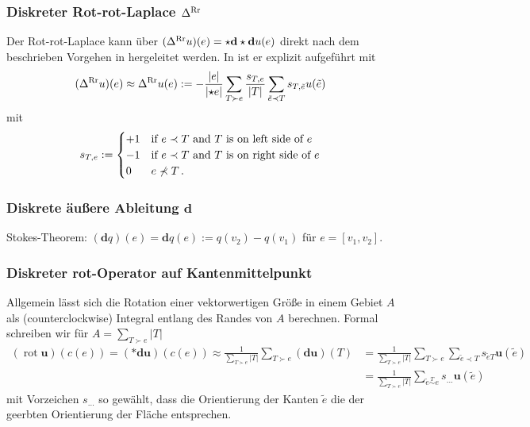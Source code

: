\documentclass[a4paper,11pt]{scrartcl}
\newcommand{\U}{u} %
\newcommand{\Ub}{\mathbf{\U}} %
\newcommand{\rot}{\operatorname{rot}} %
\newcommand{\exd}{\mathbf{d}} %
\newcommand{\lrr}{\Delta^{\textup{Rr}}} %
\newcommand{\face}{T} %
\newcommand{\facesim}{\overset{\face}{\sim}}
\newcommand{\formPeriod}{\,\text{.}}
\begin{document}
  \subsubsection{Diskreter Rot-rot-Laplace \( \lrr \)}
    Der Rot-rot-Laplace kann über \( (\lrr\U)(e) = \star\exd\star\exd\U(e) \) direkt nach dem beschrieben Vorgehen in \cite{Hirani2003} hergeleitet werden.
    In \cite{Nestler2016} ist er explizit aufgeführt mit 
    \begin{align} \label{eq:rotrotlaplace}
      (\lrr\U)(e) \approx \lrr\U(e)
          &:= -\frac{\left| e \right|}{\left| \star e \right|} \sum_{\face\succ e} \frac{s_{\face,e}}{\left| \face \right|}
                                \sum_{\tilde{e}\prec \face} s_{\face,\tilde{e}} \U(\tilde{e})
    \end{align}
    mit
    \begin{align}
      s_{\face,e} &:=
        \begin{cases}
          +1 & \text{if } e\prec \face \text{ and \( \face \) is on left side of \( e \)} \\
          -1 & \text{if } e\prec \face \text{ and \( \face \) is on right side of \( e \)} \\
           0 & e \nprec \face\formPeriod
        \end{cases}
    \end{align}

  \subsubsection{Diskrete äußere Ableitung \( \exd \)}
    Stokes-Theorem: \( (\exd q)(e) = \exd q (e) := q(v_{2}) - q(v_{1}) \) für \( e=\left[ v_{1}, v_{2} \right] \).


   
  \subsubsection{Diskreter rot-Operator auf Kantenmittelpunkt}
    Allgemein lässt sich die Rotation einer vektorwertigen Größe in einem Gebiet \( A \) als (counterclockwise) Integral entlang des Randes von \(A\)  berechnen.
    Formal schreiben wir für \( A = \sum_{\face\succ e}|\face| \)
    \begin{align}
      (\rot\Ub)(c(e)) = (*\exd\Ub)(c(e))
                     \approx  \frac{1}{\sum_{\face\succ e}|\face|}\sum_{\face\succ e}(\exd\Ub)(\face)
                     &= \frac{1}{\sum_{\face\succ e}|\face|}\sum_{\face\succ e}\sum_{\tilde{e}\prec\face}s_{\tilde{e}\face}\Ub(\tilde{e})\\
                     &= \frac{1}{\sum_{\face\succ e}|\face|}\sum_{\tilde{e}\facesim e} s_{\ldots} \Ub(\tilde{e})
    \end{align}
    mit Vorzeichen \( s_{\ldots} \) so gewählt, dass die Orientierung der Kanten \( \tilde{e} \) die der geerbten Orientierung der Fläche entsprechen.
\end{document}
